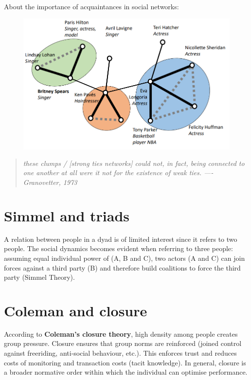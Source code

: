 \documentclass[
  notitlepage,
  onecolumn,
  openany]{book}
\begin{document}
About the importance of acquaintances in social networks:

\begin{figure}[h!]

{\centering \includegraphics[width=0.5\linewidth]{images/07-Triads and structural holes/Untitled 1} 

}

\end{figure}

\begin{quote}
\emph{these clumps / {[}strong ties networks{]} could not, in fact, being
connected to one another at all were it not for the existence of weak
ties. ---- Granovetter, 1973}
\end{quote}

\hypertarget{simmel-and-triads}{%
\section{Simmel and triads}\label{simmel-and-triads}}

A relation between people in a dyad is of limited interest since it
refers to two people. The social dynamics becomes evident when referring
to three people: assuming equal individual power of (A, B and C), two
actors (A and C) can join forces against a third party (B) and therefore
build coalitions to force the third party (Simmel Theory).

\hypertarget{coleman-and-closure}{%
\section{Coleman and closure}\label{coleman-and-closure}}

According to \textbf{Coleman's closure theory}, high density among people
creates group pressure. Closure ensures that group norms are reinforced
(joined control against freeriding, anti-social behaviour, etc.). This
enforces trust and reduces costs of monitoring and transaction costs
(tacit knowledge). In general, closure is a broader normative order
within which the individual can optimise performance.
\end{document}
